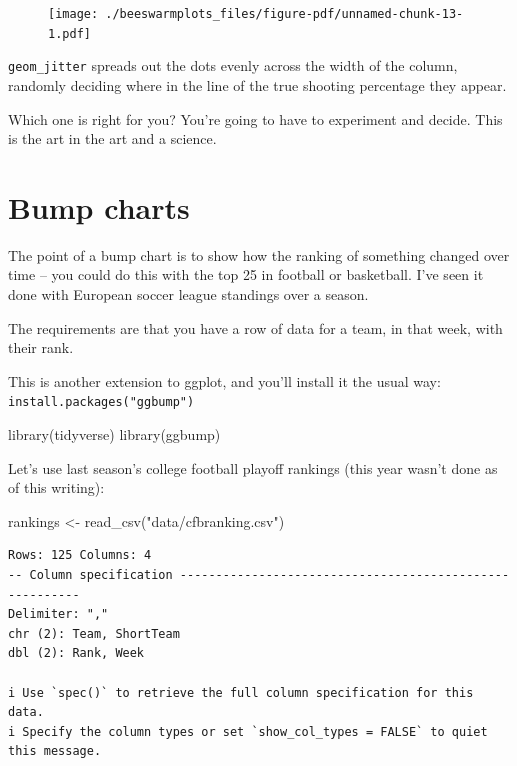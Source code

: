 \documentclass[
  letterpaper,
  DIV=11,
  numbers=noendperiod]{scrreprt}
\newenvironment{Shaded}{\begin{snugshade}}{\end{snugshade}}
\newcommand{\FunctionTok}[1]{\textcolor[rgb]{0.28,0.35,0.67}{#1}}
\newcommand{\NormalTok}[1]{\textcolor[rgb]{0.00,0.23,0.31}{#1}}
\newcommand{\OtherTok}[1]{\textcolor[rgb]{0.00,0.23,0.31}{#1}}
\newcommand{\StringTok}[1]{\textcolor[rgb]{0.13,0.47,0.30}{#1}}
\begin{document}
\begin{figure}[H]

{\centering \texttt{[image: ./beeswarmplots\_files/figure-pdf/unnamed-chunk-13-1.pdf]}

}

\end{figure}

\texttt{geom\_jitter} spreads out the dots evenly across the width of
the column, randomly deciding where in the line of the true shooting
percentage they appear.

Which one is right for you? You're going to have to experiment and
decide. This is the art in the art and a science.


\hypertarget{bump-charts}{%
\chapter{Bump charts}\label{bump-charts}}

The point of a bump chart is to show how the ranking of something
changed over time -- you could do this with the top 25 in football or
basketball. I've seen it done with European soccer league standings over
a season.

The requirements are that you have a row of data for a team, in that
week, with their rank.

This is another extension to ggplot, and you'll install it the usual
way: \texttt{install.packages("ggbump")}

\begin{Shaded}
\begin{Highlighting}[]
\FunctionTok{library}\NormalTok{(tidyverse)}
\FunctionTok{library}\NormalTok{(ggbump)}
\end{Highlighting}
\end{Shaded}

Let's use last season's college football playoff rankings (this year
wasn't done as of this writing):

\begin{Shaded}
\begin{Highlighting}[]
\NormalTok{rankings }\OtherTok{\textless{}{-}} \FunctionTok{read\_csv}\NormalTok{(}\StringTok{"data/cfbranking.csv"}\NormalTok{)}
\end{Highlighting}
\end{Shaded}

\begin{verbatim}
Rows: 125 Columns: 4
-- Column specification --------------------------------------------------------
Delimiter: ","
chr (2): Team, ShortTeam
dbl (2): Rank, Week

i Use `spec()` to retrieve the full column specification for this data.
i Specify the column types or set `show_col_types = FALSE` to quiet this message.
\end{verbatim}
\end{document}
